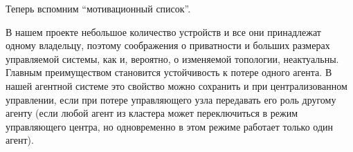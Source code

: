 \begin{itemize}
    
    
\end{itemize}

Теперь вспомним ``мотивационный список''.

В нашем проекте небольшое количество устройств и все они принадлежат одному владельцу, поэтому соображения о приватности и больших размерах управляемой системы, как и, вероятно, о изменяемой топологии, неактуальны.
Главным преимуществом становится устойчивость к потере одного агента.
В нашей агентной системе это свойство можно сохранить и при централизованном управлении, если при потере управляющего узла передавать его роль другому агенту (если любой агент из кластера может переключиться в режим управляющего центра, но одновременно в этом режиме работает только один агент).

